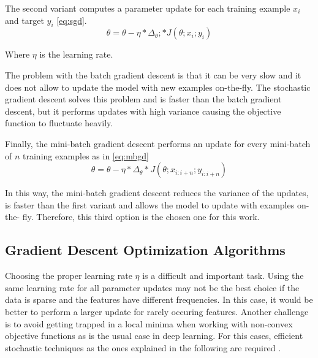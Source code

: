 The second variant computes a parameter update for each training example $x_i$ and target $y_i$ \ref{eq:sgd}.
\begin{equation} \label{eq:sgd}
\theta=\theta-\eta * \Delta_\theta; * J(\theta;x_i;y_i)
\end{equation}

Where $\eta$ is the learning rate.

The problem with the batch gradient descent is that it can be very slow and it does not allow to update the model with new examples on-the-fly. The stochastic gradient descent solves this problem and is faster than the batch gradient descent, but it performs updates with high variance causing the objective function to fluctuate heavily.  

Finally, the mini-batch gradient descent performs an update for every mini-batch of $n$ training examples as in \ref{eq:mbgd} \begin{equation} \label{eq:mbgd}
\theta=\theta-\eta * \Delta_\theta * J(\theta;x_{i:i+n};y_{i:i+n})
\end{equation}

In this way, the mini-batch gradient descent reduces the variance of the updates, is faster than the first variant and allows the model to update with examples on-the- fly. Therefore, this third option is the chosen one for this work\cite{ruder2016overview}. 

\subsection{Gradient Descent Optimization Algorithms}
Choosing the proper learning rate $\eta$ is a difficult and important task. Using the same learning rate for all parameter updates may not be the best choice if the data is sparse and the features have different frequencies. In this case, it would be better to perform a larger update for rarely occuring features. Another challenge is to avoid getting trapped in a local minima when working with non-convex objective functions as is the usual case in deep learning. For this cases, efficient stochastic techniques as the ones explained in the following are required \cite{ruder2016overview}.

